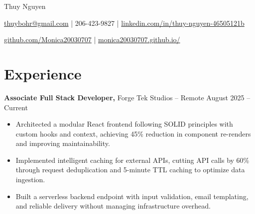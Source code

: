 \documentclass[11pt]{article}       %
\begin{document}
\centerline{\Huge Thuy Nguyen}

\vspace{5pt}

\centerline{\href{mailto:thuybohr@gmail.com}{thuybohr@gmail.com} | 206-423-9827 |
\href{https://www.linkedin.com/in/thuy-nguyen-46505121b/}{linkedin.com/in/thuy-nguyen-46505121b}}

\centerline{\href{https://github.com/Monica20030707}{github.com/Monica20030707} | 
\href{https://monica20030707.github.io/}{monica20030707.github.io/}} 

\vspace{-9pt}

\section*{Experience}

\textbf{Associate Full Stack Developer,} {Forge Tek Studios} -- Remote \hfill August 2025 -- Current 
\vspace{-9pt}
\begin{itemize}
  \item Architected a modular React frontend following SOLID principles with custom hooks and context, achieving 45\% reduction in component re-renders and improving maintainability.
  \item Implemented intelligent caching for external APIs, cutting API calls by 60\% through request deduplication and 5-minute TTL caching to optimize data ingestion.
  \item Built a serverless backend endpoint with input validation, email templating, and reliable delivery without managing infrastructure overhead.
\end{itemize}
\end{document}
